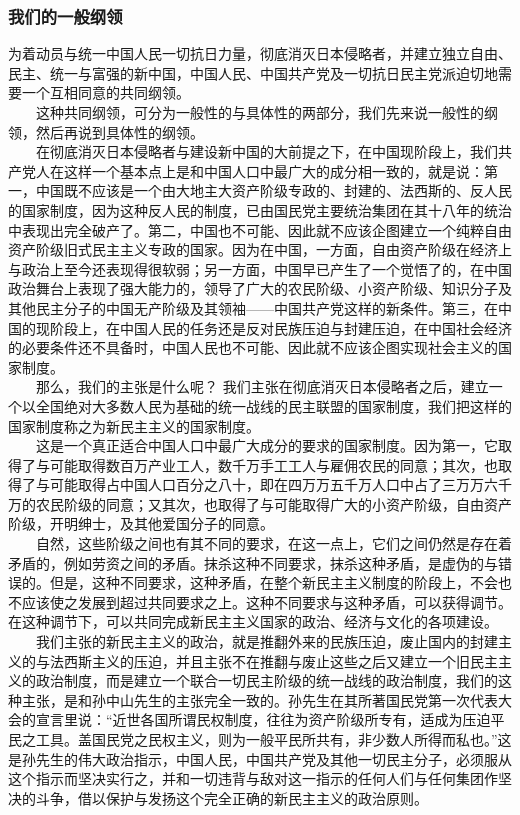 \documentclass[cn,11pt,chinese]{elegantbook}
\def\myformat#1{\hfil\hfil #1}
\begin{document}
\subsubsection*{\myformat{我们的一般纲领}}
为着动员与统一中国人民一切抗日力量，彻底消灭日本侵略者，并建立独立自由、民主、统一与富强的新中国，中国人民、中国共产党及一切抗日民主党派迫切地需要一个互相同意的共同纲领。\\
　　这种共同纲领，可分为一般性的与具体性的两部分，我们先来说一般性的纲领，然后再说到具体性的纲领。\\
　　在彻底消灭日本侵略者与建设新中国的大前提之下，在中国现阶段上，我们共产党人在这样一个基本点上是和中国人口中最广大的成分相一致的，就是说：第一，中国既不应该是一个由大地主大资产阶级专政的、封建的、法西斯的、反人民的国家制度，因为这种反人民的制度，已由国民党主要统治集团在其十八年的统治中表现出完全破产了。第二，中国也不可能、因此就不应该企图建立一个纯粹自由资产阶级旧式民主主义专政的国家。因为在中国，一方面，自由资产阶级在经济上与政治上至今还表现得很软弱；另一方面，中国早已产生了一个觉悟了的，在中国政治舞台上表现了强大能力的，领导了广大的农民阶级、小资产阶级、知识分子及其他民主分子的中国无产阶级及其领袖——中国共产党这样的新条件。第三，在中国的现阶段上，在中国人民的任务还是反对民族压迫与封建压迫，在中国社会经济的必要条件还不具备时，中国人民也不可能、因此就不应该企图实现社会主义的国家制度。\\
　　那么，我们的主张是什么呢？ 我们主张在彻底消灭日本侵略者之后，建立一个以全国绝对大多数人民为基础的统一战线的民主联盟的国家制度，我们把这样的国家制度称之为新民主主义的国家制度。\\
　　这是一个真正适合中国人口中最广大成分的要求的国家制度。因为第一，它取得了与可能取得数百万产业工人，数千万手工工人与雇佣农民的同意；其次，也取得了与可能取得占中国人口百分之八十，即在四万万五千万人口中占了三万万六千万的农民阶级的同意；又其次，也取得了与可能取得广大的小资产阶级，自由资产阶级，开明绅士，及其他爱国分子的同意。\\
　　自然，这些阶级之间也有其不同的要求，在这一点上，它们之间仍然是存在着矛盾的，例如劳资之间的矛盾。抹杀这种不同要求，抹杀这种矛盾，是虚伪的与错误的。但是，这种不同要求，这种矛盾，在整个新民主主义制度的阶段上，不会也不应该使之发展到超过共同要求之上。这种不同要求与这种矛盾，可以获得调节。在这种调节下，可以共同完成新民主主义国家的政治、经济与文化的各项建设。\\
　　我们主张的新民主主义的政治，就是推翻外来的民族压迫，废止国内的封建主义的与法西斯主义的压迫，并且主张不在推翻与废止这些之后又建立一个旧民主主义的政治制度，而是建立一个联合一切民主阶级的统一战线的政治制度，我们的这种主张，是和孙中山先生的主张完全一致的。孙先生在其所著国民党第一次代表大会的宣言里说：“近世各国所谓民权制度，往往为资产阶级所专有，适成为压迫平民之工具。盖国民党之民权主义，则为一般平民所共有，非少数人所得而私也。”这是孙先生的伟大政治指示，中国人民，中国共产党及其他一切民主分子，必须服从这个指示而坚决实行之，并和一切违背与敌对这一指示的任何人们与任何集团作坚决的斗争，借以保护与发扬这个完全正确的新民主主义的政治原则。\\
\end{document}
